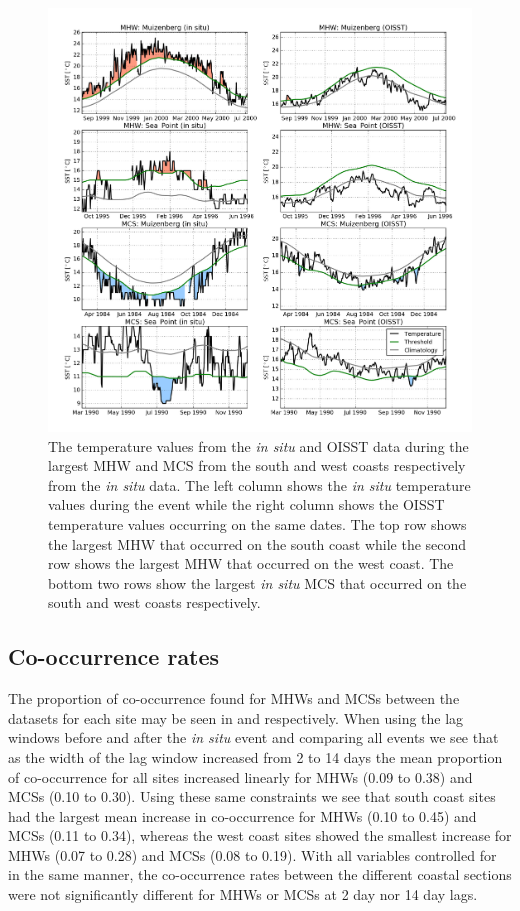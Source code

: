 \documentclass[a4paper,10pt,review]{elsarticle}
\begin{document}
\begin{figure}
\centering
\includegraphics[width=1.0\textwidth]{figure3.png}
\caption{The temperature values from the \emph{in situ} and OISST data during the largest MHW and MCS from the south and west coasts respectively from the \emph{in situ} data. The left column shows the \emph{in situ} temperature values during the event while the right column shows the OISST temperature values occurring on the same dates. The top row shows the largest MHW that occurred on the south coast while the second row shows the largest MHW that occurred on the west coast. The bottom two rows show the largest \emph{in situ} MCS that occurred on the south and west coasts respectively.}
\label{fig:Figure3}
\end{figure}

\subsection{Co-occurrence rates}
The proportion of co-occurrence found for MHWs and MCSs between the datasets for each site may be seen in  and  respectively. When using the lag windows before and after the \emph{in situ} event and comparing all events we see that as the width of the lag window increased from 2 to 14 days the mean proportion of co-occurrence for all sites increased linearly for MHWs (0.09 to 0.38) and MCSs (0.10 to 0.30). Using these same constraints we see that south coast sites had the largest mean increase in co-occurrence for MHWs (0.10 to 0.45) and MCSs (0.11 to 0.34), whereas the west coast sites showed the smallest increase for MHWs (0.07 to 0.28) and MCSs (0.08 to 0.19). With all variables controlled for in the same manner, the co-occurrence rates between the different coastal sections were not significantly different for MHWs or MCSs at 2 day nor 14 day lags.
\end{document}
